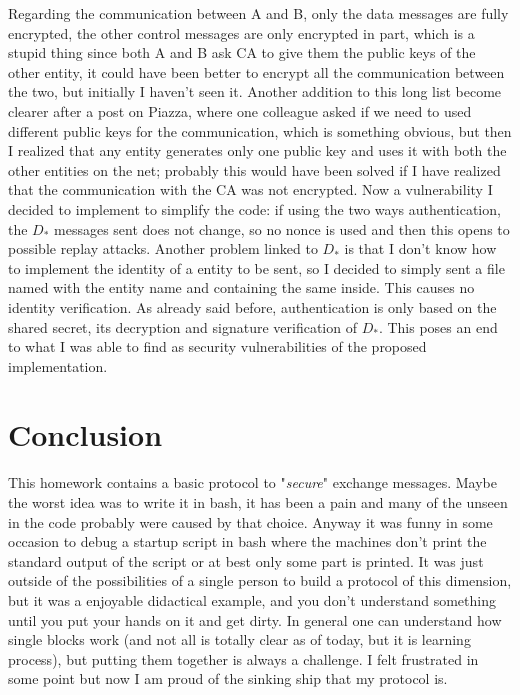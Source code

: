 \documentclass{article}
\begin{document}
Regarding the communication between A and B, only the data messages are fully encrypted, the other control messages are only encrypted in part, which is a stupid thing since both A and B ask CA to give them the public keys of the other entity, it could have been better to encrypt all the communication between the two, but initially I haven't seen it.\newline
Another addition to this long list become clearer after a post on Piazza, where one colleague asked if we need to used different public keys for the communication, which is something obvious, but then I realized that any entity generates only one public key and uses it with both the other entities on the net; probably this would have been solved if I have realized that the communication with the CA was not encrypted.\newline
Now a vulnerability I decided to implement to simplify the code: if using the two ways authentication, the $D_*$ messages sent does not change, so no nonce is used and then this opens to possible replay attacks. Another problem linked to $D_*$ is that I don't know how to implement the identity of a entity to be sent, so I decided to simply sent a file named with the entity name and containing the same inside. This causes no identity verification. As already said before, authentication is only based on the shared secret, its decryption and signature verification of $D_*$.\newline
This poses an end to what I was able to find as security vulnerabilities of the proposed implementation.


\section{Conclusion}

This homework contains a basic protocol to "\textit{secure}" exchange messages. Maybe the worst idea was to write it in bash, it has been a pain and many of the unseen in the code probably were caused by that choice. Anyway it was funny in some occasion to debug a startup script in bash where the machines don't print the standard output of the script or at best only some part is printed. It was just outside of the possibilities of a single person to build a protocol of this dimension, but it was a enjoyable didactical example, and you don't understand something until you put your hands on it and get dirty. In general one can understand how single blocks work (and not all is totally clear as of today, but it is learning process), but putting them together is always a challenge. I felt frustrated in some point but now I am proud of the sinking ship that my protocol is.
\end{document}
